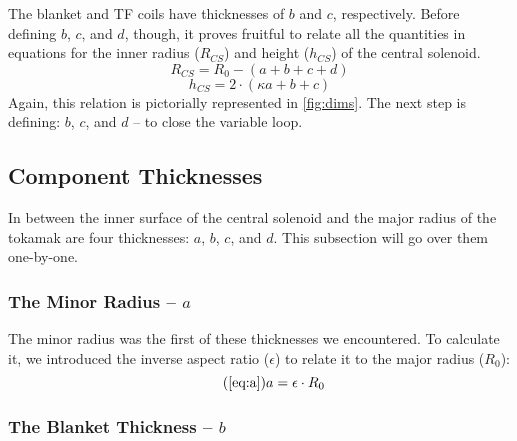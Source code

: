 \begin{figure*}
\centering

\caption{Dimensions of Tokamak Cross-Section}
\label{fig:dims}
\end{figure*}

The blanket and TF coils have thicknesses of $b$ and $c$, respectively. Before defining $b$, $c$, and $d$, though, it proves fruitful to relate all the quantities in equations for the inner radius ($R_{CS}$) and height ($h_{CS}$) of the central solenoid.
 \begin{equation}
 	\label{eq:rcs1}
 	R_{CS} = R_0 - ( a + b + c + d )
 \end{equation}
 \begin{equation}
	\label{eq:hcs1}
 	h_{CS} = 2 \cdot \left ( \kappa a + b + c \right)
 \end{equation}
Again, this relation is pictorially represented in \cref{fig:dims}. The next step is defining: $b$, $c$, and $d$ -- to close the variable loop.

\subsection{ Component Thicknesses}

In between the inner surface of the central solenoid and the major radius of the tokamak are four thicknesses: $a$, $b$, $c$, and $d$. This subsection will go over them one-by-one.

\subsubsection{The Minor Radius -- $a$}

The minor radius was the first of these thicknesses we encountered. To calculate it, we introduced the inverse aspect ratio ($\epsilon$) to relate it to the major radius ($R_0$):
\begin{equation}
	\tag{\ref{eq:a}}
	a = \epsilon \cdot R_0
\end{equation}

\subsubsection{The Blanket Thickness -- $b$}

